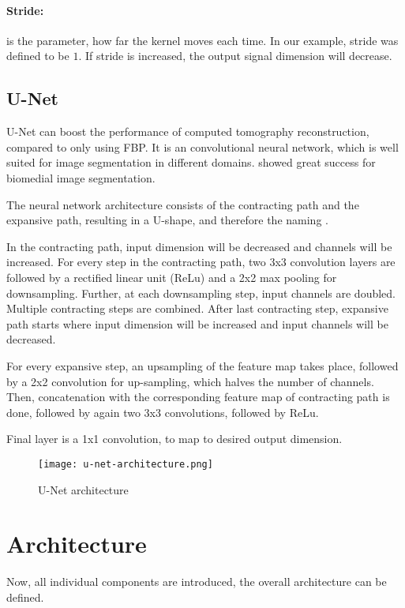 \paragraph{Stride:}
is the parameter, how far the kernel moves each time. In our example, stride was defined to be $1$.
If stride is increased, the output signal dimension will decrease.


\subsection{U-Net}
U-Net can boost the performance of computed tomography reconstruction, compared to only using FBP.
It is an convolutional neural network, which is well suited for image segmentation in different domains.
\cite{unet-tomography} showed great success for biomedial image segmentation.

The neural network architecture consists of the contracting path and the expansive path,
resulting in a U-shape, and therefore the naming \cite{unet-tomography}.

In the contracting path, input dimension will be decreased and channels will be increased.
For every step in the contracting path, two 3x3 convolution layers are followed by a rectified linear unit (ReLu)
and a 2x2 max pooling for downsampling. Further, at each downsampling step, input channels are doubled.
Multiple contracting steps are combined. After last contracting step, expansive path starts
where input dimension will be increased and input channels will be decreased.

For every expansive step, an upsampling of the feature map takes place, followed by a 2x2 convolution
for up-sampling, which halves the number of channels. Then, concatenation with the corresponding feature
map of contracting path is done, followed by again two 3x3 convolutions, followed by ReLu.

Final layer is a 1x1 convolution, to map to desired output dimension.



\begin{figure}[h]
  \centering
  \label{fig:architecture-overall}
  \texttt{[image: u-net-architecture.png]}
  \caption{U-Net architecture \cite[p 2, Fig. 1]{unet-tomography}}
\end{figure}




\section{Architecture}
Now, all individual components are introduced, the overall architecture can be defined.

